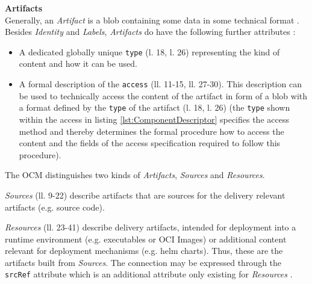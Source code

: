 \noindent\textbf{Artifacts}\\
Generally, an \emph{Artifact} is a blob containing some data in some technical format \cite{OCMSpec}. Besides \emph{Identity} and \emph{Labels}, \emph{Artifacts} do have the following further attributes \cite{OCMSpec}:
\begin{itemize}
\item A dedicated globally unique \lstinline|type| (l. 18, l. 26) representing the kind of content and how it can be used.
\item A formal description of the \lstinline|access| (ll. 11-15, ll. 27-30). This description can be used to technically access the content of the artifact in form of a blob with a format defined by the \lstinline|type| of the artifact (l. 18, l. 26) (the \lstinline|type| shown within the access in listing \ref{lst:ComponentDescriptor} specifies the access method and thereby determines the formal procedure how to access the content and the fields of the access specification required to follow this procedure).
\end{itemize}
The OCM distinguishes two kinds of \emph{Artifacts}, \emph{Sources} and \emph{Resources}.\par
\emph{Sources} (ll. 9-22) describe artifacts that are sources for the delivery relevant artifacts (e.g. source code).\par
\emph{Resources} (ll. 23-41) describe delivery artifacts, intended for deployment into a runtime environment (e.g. executables or OCI Images) or additional content relevant for deployment mechanisms (e.g. helm charts). Thus, these are the artifacts built from \emph{Sources}. The connection may be expressed through the \lstinline|srcRef| attribute which is an additional attribute only existing for \emph{Resources} \cite{OCMSpec}.\\

